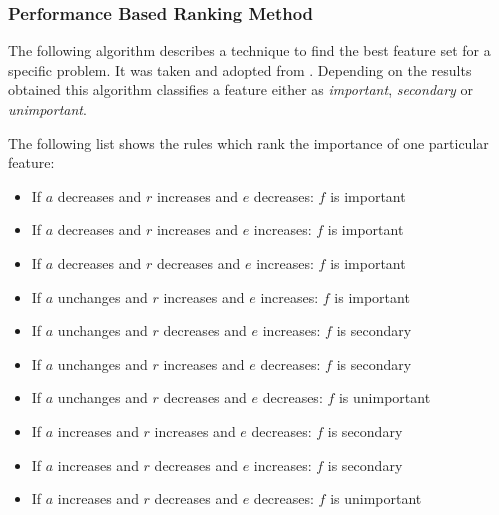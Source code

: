 \subsubsection{Performance Based Ranking Method}

The following algorithm describes a technique to find the best feature set for a specific problem. It was taken and adopted from \cite{nn_features}. Depending on the results obtained this algorithm classifies a feature either as {\em important}, {\em secondary} or {\em unimportant}.

\setlength{\fboxsep}{1em}
\begin{center}


\end{center}

The following list shows the rules which rank the importance of one particular feature:

\begin{itemize}
	\addtolength{\itemsep}{-1.5ex}

    \item If $a$ decreases and $r$ increases and $e$ decreases: $f$ is important
	\item If $a$ decreases and $r$ increases and $e$ increases: $f$ is important
	\item If $a$ decreases and $r$ decreases and $e$ increases: $f$ is important
	\item If $a$ unchanges and $r$ increases and $e$ increases: $f$ is important
	\item If $a$ unchanges and $r$ decreases and $e$ increases: $f$ is secondary
	\item If $a$ unchanges and $r$ increases and $e$ decreases: $f$ is secondary
	\item If $a$ unchanges and $r$ decreases and $e$ decreases: $f$ is unimportant
	\item If $a$ increases and $r$ increases and $e$ decreases: $f$ is secondary
	\item If $a$ increases and $r$ decreases and $e$ increases: $f$ is secondary
	\item If $a$ increases and $r$ decreases and $e$ decreases: $f$ is unimportant
\end{itemize}

